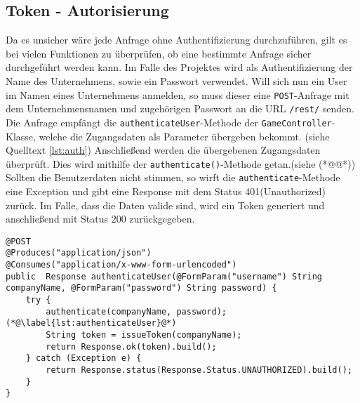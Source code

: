 \subsection{Token - Autorisierung}

Da es unsicher wäre jede Anfrage ohne Authentifizierung durchzuführen, gilt es bei vielen Funktionen zu überprüfen, ob eine bestimmte Anfrage sicher durchgeführt werden kann.
Im Falle des Projektes wird als Authentifizierung der Name des Unternehmens, sowie ein Passwort verwendet. Will sich nun ein User im Namen eines Unternehmens anmelden, so muss dieser eine \texttt{POST}-Anfrage mit dem Unternehmensnamen und zugehörigen Passwort an die URL \texttt{/rest/} senden. 
Die Anfrage empfängt die \texttt{authenticateUser}-Methode der \texttt{GameController}-Klasse, welche die Zugangsdaten als Parameter übergeben bekommt. (siehe Quelltext \ref{lst:auth}) 
Anschließend werden die übergebenen Zugangsdaten überprüft. Dies wird mithilfe der \texttt{authenticate()}-Methode getan.(siehe (*@\label{lst:authenticateUser}@*))
Sollten die Benutzerdaten nicht stimmen, so wirft die \texttt{authenticate}-Methode eine Exception und gibt eine Response mit dem Status 401(Unauthorized) zurück. Im Falle, dass die Daten valide sind, wird ein Token generiert und anschließend mit Status 200 zurückgegeben.

\lstset{language=JAVA}
\begin{lstlisting}[float=htbp, caption={\texttt{authentivateUser() Methode der \texttt{GameController}-Klasse} }, label={lst:auth}]
@POST
@Produces("application/json")
@Consumes("application/x-www-form-urlencoded")
public  Response authenticateUser(@FormParam("username") String companyName, @FormParam("password") String password) {
	try {
		authenticate(companyName, password);  (*@\label{lst:authenticateUser}@*)
		String token = issueToken(companyName);
		return Response.ok(token).build();
	} catch (Exception e) {
		return Response.status(Response.Status.UNAUTHORIZED).build();
	}
}
\end{lstlisting}

